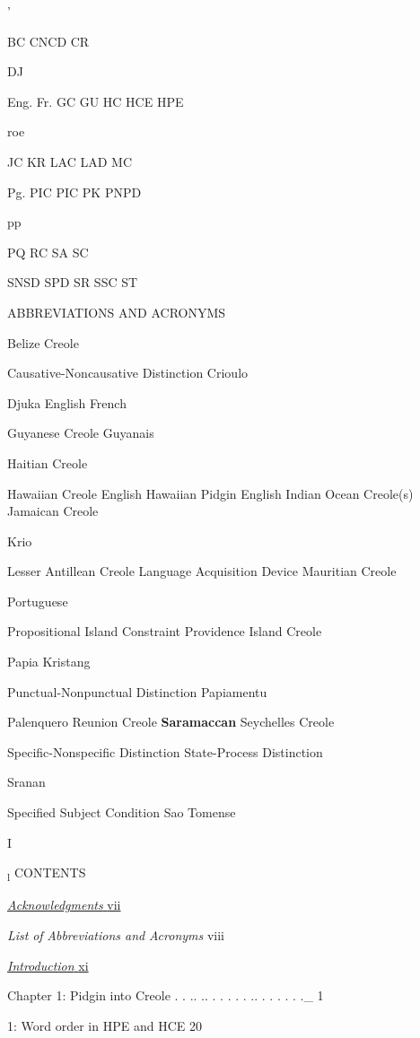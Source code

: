 '

BC CNCD CR

DJ

Eng. Fr. GC GU HC HCE HPE

roe

JC KR LAC LAD MC

Pg. PIC PIC PK PNPD

pp

PQ RC SA SC

SNSD SPD SR SSC ST

ABBREVIATIONS AND ACRONYMS

Belize Creole

Causative-Noncausative Distinction Crioulo

Djuka English French

Guyanese Creole Guyanais

Haitian Creole

Hawaiian Creole English Hawaiian Pidgin English Indian Ocean Creole(s) Jamaican Creole

Krio

Lesser Antillean Creole Language Acquisition Device Mauritian Creole

Portuguese

Propositional Island Constraint Providence Island Creole

Papia Kristang

Punctual-Nonpunctual Distinction Papiamentu

Palenquero Reunion Creole \textbf{Saramaccan} Seychelles Creole

Specific-Nonspecific Distinction State-Process Distinction

Sranan

Specified Subject Condition Sao Tomense

I

\textsubscript{l }CONTENTS 

\hyperlink{TOC250001}{\textit{Acknowledgments}}\hyperlink{TOC250001}{ }\hyperlink{TOC250001}{vii}

\textit{List}\textit{ }\textit{of}\textit{ }\textit{Abbreviations and}\textit{ }\textit{Acronyms} viii

\hyperlink{TOC250000}{\textit{Introduction}}\hyperlink{TOC250000}{ }\hyperlink{TOC250000}{xi}

Chapter 1: Pidgin into Creole . . .. .. . . . . . .. . . . . . .\_ 1

\begin{table}
\caption{1: Word order in HPE and HCE 20}
\label{tab:1}
\end{table}

